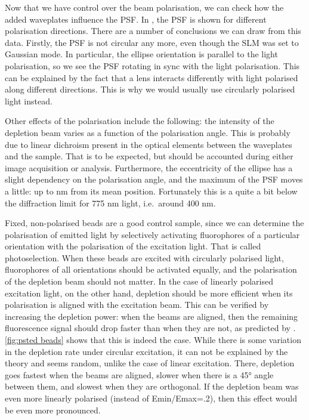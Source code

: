 Now that we have control over the beam polarisation, we can check how the added waveplates influence the PSF. In , the PSF is shown for different polarisation directions. There are a number of conclusions we can draw from this data.  Firstly, the PSF is not circular any more, even though the SLM was set to Gaussian mode. In particular, the ellipse orientation is parallel to the light polarisation, so we see the PSF rotating in sync with the light polarisation. This can be explained by the fact that a lens interacts differently with light polarised along different directions. This is why we would usually use circularly polarised light instead.

Other effects of the polarisation include the following: the intensity of the depletion beam varies as a function of the polarisation angle. This is probably due to linear dichroism present in the optical elements between the waveplates and the sample. That is to be expected, but should be accounted during either image acquisition or analysis. Furthermore, the eccentricity of the ellipse has a slight dependency on the polarisation angle, and the maximum of the PSF moves a little: up to  nm from its mean position. Fortunately this is a quite a bit below the diffraction limit for 775 nm light, i.e.~around 400 nm.

Fixed, non-polarised beads are a good control sample, since we can determine the polarisation of emitted light by selectively activating fluorophores of a particular orientation with the polarisation of the excitation light. That is called photoselection.  When these beads are excited with circularly polarised light, fluorophores of all orientations should be activated equally, and the polarisation of the depletion beam should not matter. In the case of linearly polarised excitation light, on the other hand, depletion should be more efficient when its polarisation is aligned with the excitation beam. This can be verified by increasing the depletion power: when the beams are aligned, then the remaining fluorescence signal should drop faster than when they are not, as predicted by . \autoref{fig:psted beads} shows that this is indeed the case. While there is some variation in the depletion rate under circular excitation, it can not be explained by the theory and seems random, unlike the case of linear excitation. There, depletion goes fastest when the beams are aligned, slower when there is a 45° angle between them, and slowest when they are orthogonal. If the depletion beam was even more linearly polarised (instead of Emin/Emax=.2), then this effect would be even more pronounced.

